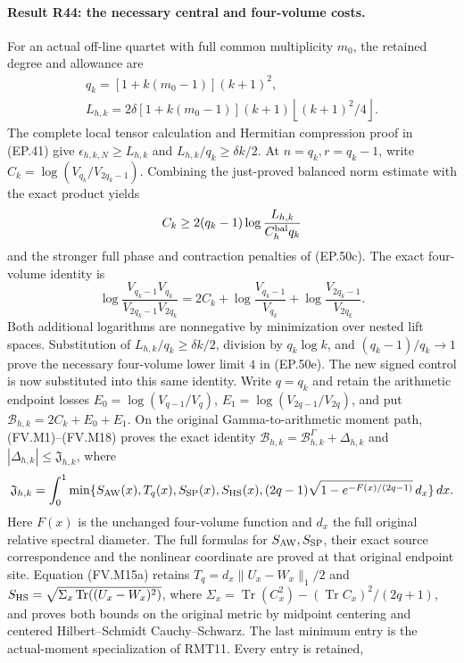 \paragraph{Result R44: the necessary central and four-volume costs.}
For an actual off-line quartet with full common multiplicity $m_0$,
the retained degree and allowance are
\begin{gather*}
 q_k=[1+k(m_0-1)](k+1)^2,\\
 L_{h,k}=2\delta[1+k(m_0-1)](k+1)
                \left\lfloor (k+1)^2/4\right\rfloor.
\end{gather*}
The complete local tensor calculation and Hermitian compression
proof in (EP.41) give $\epsilon_{h,k,N}\ge L_{h,k}$ and
$L_{h,k}/q_k\ge\delta k/2$. At $n=q_k,r=q_k-1$, write
$C_k=\log(V_{q_k}/V_{2q_k-1})$. Combining the just-proved
balanced norm estimate with the exact product yields
\[
 C_k\ge2(q_k-1)\log\frac{L_{h,k}}{C_h^{\rm bal}q_k}
\]
and the stronger full phase and contraction penalties of (EP.50c).
The exact four-volume identity is
\[
 \log\frac{V_{q_k-1}V_{q_k}}{V_{2q_k-1}V_{2q_k}}
 =2C_k+\log\frac{V_{q_k-1}}{V_{q_k}}
          +\log\frac{V_{2q_k-1}}{V_{2q_k}}.
\]
Both additional logarithms are nonnegative by minimization over
nested lift spaces. Substitution of $L_{h,k}/q_k\ge\delta k/2$,
division by $q_k\log k$, and $(q_k-1)/q_k\to1$ prove the
necessary four-volume lower limit $4$ in (EP.50e).
The new signed control is now substituted into this same identity.
Write $q=q_k$ and retain the arithmetic endpoint losses
$E_0=\log(V_{q-1}/V_q)$, $E_1=\log(V_{2q-1}/V_{2q})$, and put
$\mathcal B_{h,k}=2C_k+E_0+E_1$. On the original Gamma-to-arithmetic
moment path, (FV.M1)--(FV.M18) proves the exact identity
$\mathcal B_{h,k}=\mathcal B^\Gamma_{h,k}+\Delta_{h,k}$ and
$|\Delta_{h,k}|\le\mathfrak J_{h,k}$, where
\[
 \mathfrak J_{h,k}=\int_0^1
 \min\{S_{\rm AW}(x),T_q(x),S_{\rm SP}(x),S_{\rm HS}(x),
             (2q-1)\sqrt{1-e^{-F(x)/(2q-1)}}\,d_x\}\,dx.
\]
Here $F(x)$ is the unchanged four-volume function and $d_x$ the
full original relative spectral diameter. The full formulas for
$S_{\rm AW},S_{\rm SP}$, their exact source correspondence and
the nonlinear coordinate are proved at that original endpoint site.
Equation (FV.M15a) retains
$T_q=d_x\|U_x-W_x\|_1/2$ and
$S_{\rm HS}=\sqrt{\Sigma_x\operatorname{Tr}((U_x-W_x)^2)}$, where
$\Sigma_x=\operatorname{Tr}(C_x^2)-(\operatorname{Tr}C_x)^2/(2q+1)$,
and proves both bounds on the original metric by midpoint centering
and centered Hilbert--Schmidt Cauchy--Schwarz. The last minimum entry
is the actual-moment specialization of RMT11. Every entry is retained,
